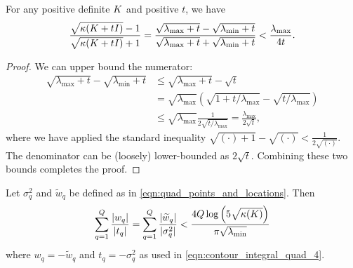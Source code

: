 \begin{lemma}
  For any positive definite $K$ and positive $t$, we have
  \begin{align}
    \frac{
      \sqrt{\kappa(K + t I)} - 1
    }{
      \sqrt{\kappa(K + t I)} + 1
    } = \frac{\sqrt{\lambda_\text{max} + t} - \sqrt{\lambda_\text{min} + t}  }{\sqrt{\lambda_\text{max} + t} + \sqrt{\lambda_\text{min} + t}  }
    < \frac{\lambda_\text{max}}{4t}.
  \end{align}
  \label{lemma:condition}
\end{lemma}

\begin{proof}
  We can upper bound the numerator:
  \begin{align*}
    \sqrt{\lambda_\text{max} + t} - \sqrt{\lambda_\text{min} + t}
    &\leq
    \sqrt{\lambda_\text{max} + t} - \sqrt{t}
    \\
    &=
    \sqrt{\lambda_\text{max}} \left( \sqrt{1 + t/\lambda_\text{max}} - \sqrt{t/\lambda_\text{max}} \right)
    \\
    &\leq
    \sqrt{\lambda_\text{max}} \frac{1}{2 \sqrt{t/\lambda_\text{max}}}
    =
    \frac{\lambda_\text{max}}{2 \sqrt{t}},
  \end{align*}
  where we have applied the standard inequality $\sqrt{(\cdot)+1} - \sqrt{(\cdot)} < \frac{1}{2 \sqrt{(\cdot)}}$.
  The denominator can be (loosely) lower-bounded as $2\sqrt{t}$.
  Combining these two bounds completes the proof.
\end{proof}




\begin{lemma}
  Let $\sigma_q^2$ and $\widetilde w_q$ be defined as in \cref{eqn:quad_points_and_locations}.
  Then
  \begin{equation*}
    \sum_{q=1}^Q \frac{|w_q|}{|t_q|} = \sum_{q=1}^Q \frac{|\widetilde w_q|}{|\sigma^2_q|} < \frac{4 Q \log \left( 5 \sqrt{\kappa(K)} \right)  }{\pi \sqrt{\lambda_\text{min}}} \\
  \end{equation*}
  where $w_q = -\widetilde w_q$ and $t_q = -\sigma^2_q$ as used in \cref{eqn:contour_integral_quad_4}.
  \label{lemma:quad_ratio}
\end{lemma}

